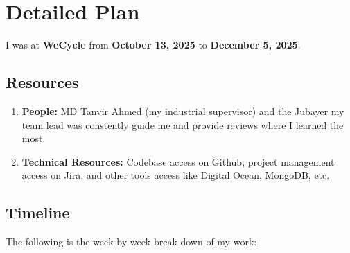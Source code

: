 \section{Detailed Plan}

\par I was at \textbf{WeCycle} from \textbf{October 13, 2025} to \textbf{December 5, 2025}.

\subsection{Resources}

\begin{enumerate}
    \item \textbf{People:} MD Tanvir Ahmed (my industrial supervisor) and the Jubayer my team lead was constently guide me and provide reviews where I learned the most.
    \item \textbf{Technical Resources:} Codebase access on Github, project management access on Jira, and other tools access like Digital Ocean, MongoDB, etc.
\end{enumerate}

\subsection{Timeline}

\par The following is the week by week break down of my work:

